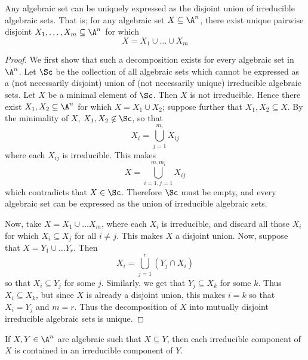 \begin{theorem}\label{1.5.3}
    Any algebraic set can be uniquely expressed as the disjoint union of
    irreducible algebraic sets. That is; for any algebraic set $X \subseteq
    \A^n$, there exist unique pairwise disjoint $X_1, \dots, X_m \subseteq \A^n$
    for which
    \begin{equation*}
        X=X_1 \cup \dots \cup X_m
    \end{equation*}
\end{theorem}
\begin{proof}
    We first show that such a decomposition exists for every algebraic set in
    $\A^n$. Let  $\Sc$ be the collection of all algebraic sets which cannot be
    expressed as a (not necessarily disjoint) union of (not necessarily unique)
    irreducible algebraic sets. Let $X$ be a minimal element of $\Sc$. Then
    $X$ is not irreducible. Hence there exist $X_1, X_2 \subseteq \A^n$ for
    which $X=X_1 \cup X_2$; suppose further that $X_1,X_2 \subseteq X$. By the
    minimality of $X$,  $X_1, X_2 \not\in \Sc$, so that
    \begin{equation*}
        X_i=\bigcup_{j=1}^{m_i}{X_{ij}}
    \end{equation*}
    where each $X_{ij}$ is irreducible. This makes
    \begin{equation*}
        X=\bigcup_{i=1,j=1}^{m,m_i}{X_{ij}}
    \end{equation*}
    which contradicts that $X \in \Sc$. Therefore $\Sc$ must be empty, and every
    algebraic set can be expressed as the union of irreducible algebraic sets.

    Now, take  $X=X_1 \cup \dots X_m$, where each $X_i$ is irreducible, and
    discard all those $X_i$ for which  $X_i \subseteq X_j$ for all $i \neq j$.
    This makes $X$ a disjoint union. Now, suppose that  $X=Y_1 \cup \dots Y_r$.
    Then
    \begin{equation*}
        X_i=\bigcup_{j=1}^r{(Y_j \cap X_i)}
    \end{equation*}
    so that $X_i \subseteq Y_j$ for some $j$. Similarly, we get that  $Y_j
    \subseteq X_k$ for some $k$. Thus $X_i \subseteq X_k$, but since $X$ is
    already a disjoint union, this makes  $i=k$ so that $X_i=Y_j$ and $m=r$.
    Thus the decomposition of $X$ into mutually disjoint irreducible algebraic
    sets is unique.
\end{proof}
\begin{corollary}
    If $X,Y \in \A^n$ are algebraic such that $X \subseteq Y$, then each
    irreducible component of $X$ is contained in an irreducible component of
    $Y$.
\end{corollary}
